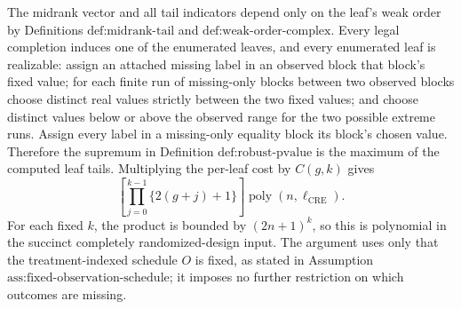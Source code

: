The midrank vector and all tail indicators depend only on the leaf's weak
order by Definitions \(\text{def:midrank-tail}\) and
\(\text{def:weak-order-complex}\).  Every legal completion induces one of the
enumerated leaves, and every enumerated leaf is realizable: assign an attached
missing label in an observed block that block's fixed value; for each finite
run of missing-only blocks between two observed blocks choose distinct real
values strictly between the two fixed values; and choose distinct values below
or above the observed range for the two possible extreme runs.  Assign every
label in a missing-only equality block its block's chosen value.  Therefore the
supremum in
Definition \(\text{def:robust-pvalue}\) is the maximum of the computed leaf
tails.  Multiplying the per-leaf cost by \(C(g,k)\) gives
\[
 \left[\prod_{j=0}^{k-1}\{2(g+j)+1\}\right]
 \operatorname{poly}(n,\ell_{\mathrm{CRE}}).
\]
For each fixed \(k\), the product is bounded by \((2n+1)^k\), so this is
polynomial in the succinct completely randomized-design input.  The argument
uses only that the treatment-indexed schedule \(O\) is fixed, as stated in
Assumption \(\text{ass:fixed-observation-schedule}\); it imposes no further
restriction on which outcomes are missing.

